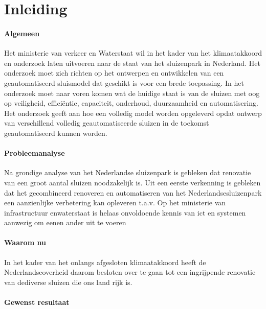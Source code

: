 \chapter{Inleiding}
\label{chapter:Inleiding}
\thispagestyle{myheadings}





\subsubsection{Algemeen}

Het ministerie van verkeer en Waterstaat wil in het kader van het klimaatakkoord en onderzoek laten uitvoeren naar de staat van het sluizenpark in Nederland. Het onderzoek moet zich richten op het ontwerpen en ontwikkelen van een geautomatiseerd sluismodel dat geschikt is voor een brede toepassing. In het onderzoek moet naar voren komen wat de huidige staat is van de sluizen met oog op veiligheid, efficiëntie, capaciteit, onderhoud, duurzaamheid en automatisering. Het onderzoek geeft aan hoe een volledig model worden opgeleverd opdat ontwerp van verschillend volledig geautomatiseerde sluizen in de toekomst geautomatiseerd kunnen worden.  

\subsubsection{Probleemanalyse}

Na grondige analyse van het Nederlandse sluizenpark is gebleken dat renovatie van een groot aantal sluizen noodzakelijk is.  Uit een eerste verkenning is gebleken  dat het gecombineerd renoveren en automatiseren van het Nederlandsesluizenpark een aanzienlijke verbetering kan opleveren t.a.v. 
Op  het  ministerie  van  infrastructuur  enwaterstaat is helaas onvoldoende kennis van ict en systemen aanwezig om eenen ander uit te voeren 

\subsubsection{Waarom nu}
In  het  kader  van  het  onlangs  afgesloten  klimaatakkoord  heeft  de  Nederlandseoverheid  daarom  besloten  over  te  gaan  tot  een  ingrijpende  renovatie  van  dediverse  sluizen  die  ons  land  rijk  is.     

\subsubsection{Gewenst resultaat }



